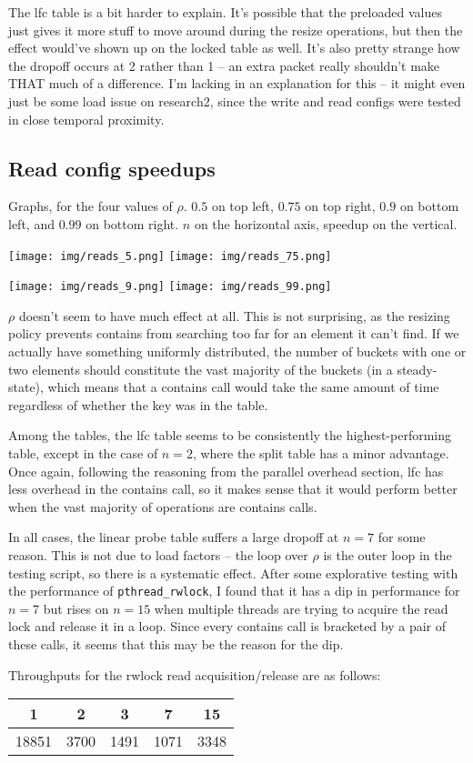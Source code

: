 \documentclass{article}
\begin{document}
The lfc table is a bit harder to explain. It's possible that the preloaded values just gives it more stuff to move around during the resize operations, but then the effect would've shown up on the locked table as well. It's also pretty strange how the dropoff occurs at 2 rather than 1 -- an extra packet really shouldn't make THAT much of a difference. I'm lacking in an explanation for this -- it might even just be some load issue on research2, since the write and read configs were tested in close temporal proximity. 
\subsection*{Read config speedups}
Graphs, for the four values of $\rho$. $0.5$ on top left, $0.75$ on top right, $0.9$ on bottom left, and $0.99$ on bottom right. $n$ on the horizontal axis, speedup on the vertical.

\texttt{[image: img/reads\_5.png]}
\texttt{[image: img/reads\_75.png]}

\texttt{[image: img/reads\_9.png]}
\texttt{[image: img/reads\_99.png]}

$\rho$ doesn't seem to have much effect at all. This is not surprising, as the resizing policy prevents contains from searching too far for an element it can't find. If we actually have something uniformly distributed, the number of buckets with one or two elements should constitute the vast majority of the buckets (in a steady-state), which means that a contains call would take the same amount of time regardless of whether the key was in the table.

Among the tables, the lfc table seems to be consistently the highest-performing table, except in the case of $n=2$, where the split table has a minor advantage. Once again, following the reasoning from the parallel overhead section, lfc has less overhead in the contains call, so it makes sense that it would perform better when the vast majority of operations are contains calls.

In all cases, the linear probe table suffers a large dropoff at $n=7$ for some reason. This is not due to load factors -- the loop over $\rho$ is the outer loop in the testing script, so there is a systematic effect. After some explorative testing with the performance of \verb|pthread_rwlock|, I found that it has a dip in performance for $n=7$ but rises on $n=15$ when multiple threads are trying to acquire the read lock and release it in a loop. Since every contains call is bracketed by a pair of these calls, it seems that this may be the reason for the dip.

Throughputs for the rwlock read acquisition/release are as follows:

\begin{tabular}{ccccc}
    1&2&3&7&15\\
    \hline
    18851&3700&1491&1071&3348\\
\end{tabular}
\end{document}

